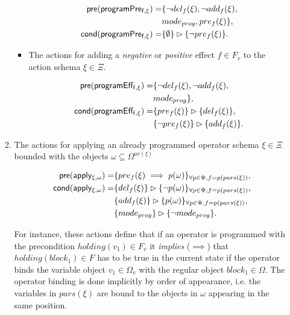 \documentclass[letterpaper]{article} %
\newcommand{\pre}{\mathsf{pre}}     %
\newcommand{\cond}{\mathsf{cond}}   %
\begin{document}
\begin{itemize}
\begin{enumerate}
\begin{itemize}
\begin{small}
\begin{align*}
\hspace*{7pt}\pre(\mathsf{programPre_{f,\xi}})=&\{\neg del_{f}(\xi),\neg add_{f}(\xi),\\
& mode_{prog},pre_{f}(\xi)\},\\    
\cond(\mathsf{programPre_{f,\xi}})=&\{\emptyset\}\rhd\{\neg pre_{f}(\xi)\}.
\end{align*}
\end{small}

\item The actions for adding a {\em negative} or {\em positive} effect $f\in F_v$ to the action schema $\xi\in\Xi$.

\begin{small}
\begin{align*}
\hspace*{7pt}\pre(\mathsf{programEff_{f,\xi}})=&\{\neg del_{f}(\xi),\neg add_{f}(\xi),\\                                                   
& mode_{prog}\},\\ 
\cond(\mathsf{programEff_{f,\xi}})=&\{pre_{f}(\xi)\}\rhd\{del_{f}(\xi)\},\\
&\{\neg pre_{f}(\xi)\}\rhd\{add_{f}(\xi)\}.
\end{align*}
\end{small}
\end{itemize}

\item The actions for applying an already programmed operator schema $\xi\in\Xi$ bounded with the objects $\omega\subseteq\Omega^{ar(\xi)}$
\begin{small}
\begin{align*}
\hspace*{7pt}\pre(\mathsf{apply_{\xi,\omega}})=&\{pre_{f}(\xi)\implies p(\omega)\}_{\forall p\in\Psi,f=p(pars(\xi))},\\
\cond(\mathsf{apply_{\xi,\omega}})=&\{del_{f}(\xi)\}\rhd\{\neg p(\omega)\}_{\forall p\in\Psi,f=p(pars(\xi))},\\
&\{add_{f}(\xi)\}\rhd\{p(\omega)\}_{\forall p\in\Psi,f=p(pars(\xi))},\\
&\{mode_{prog}\}\rhd\{\neg mode_{prog}\}.
\end{align*}
\end{small}

For instance, these actions define that if an operator is programmed with the precondition $holding(v_1)\in F_v$ it {\em implies} ($\implies$) that $holding(block_1)\in F$ has to be true in the current state if the operator binds the variable object $v_1\in\Omega_v$ with the regular object $block_1\in\Omega$. The operator binding is done implicitly by order of appearance, i.e. the variables in $pars(\xi)$ are bound to the objects in $\omega$ appearing in the same position. 


\end{enumerate}
\end{itemize}
\end{document}
